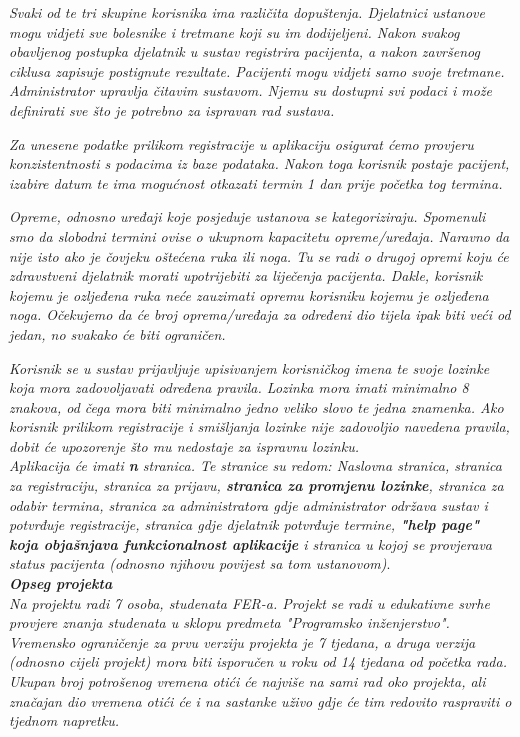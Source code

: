 		\textit{Svaki od te tri skupine korisnika ima različita dopuštenja. Djelatnici ustanove mogu vidjeti sve bolesnike i tretmane koji su im dodijeljeni. Nakon svakog obavljenog postupka djelatnik u sustav registrira pacijenta, a nakon završenog ciklusa zapisuje postignute rezultate. Pacijenti mogu vidjeti samo svoje tretmane. Administrator upravlja čitavim sustavom. Njemu su dostupni svi podaci i može definirati sve što je potrebno za ispravan rad sustava.}
		
		\textit{Za unesene podatke prilikom registracije u aplikaciju osigurat ćemo provjeru konzistentnosti s podacima iz baze podataka. Nakon toga korisnik postaje pacijent, izabire datum te ima mogućnost otkazati termin 1 dan prije početka tog termina.}
		
		\textit{Opreme, odnosno uređaji koje posjeduje ustanova se kategoriziraju. Spomenuli smo da slobodni termini ovise o ukupnom kapacitetu opreme/uređaja. Naravno da nije isto ako je čovjeku oštećena ruka ili noga. Tu se radi o drugoj opremi koju će zdravstveni djelatnik morati upotrijebiti za liječenja pacijenta. Dakle, korisnik kojemu je ozljeđena ruka neće zauzimati opremu korisniku kojemu je ozljeđena noga. Očekujemo da će broj oprema/uređaja za određeni dio tijela ipak biti veći od jedan, no svakako će biti ograničen.}
		
		\textit{Korisnik se u sustav prijavljuje upisivanjem korisničkog imena te svoje lozinke koja mora zadovoljavati određena pravila. Lozinka mora imati minimalno 8 znakova, od čega mora biti minimalno jedno veliko slovo te jedna znamenka. Ako korisnik prilikom registracije i smišljanja lozinke nije zadovoljio navedena pravila, dobit će upozorenje što mu nedostaje za ispravnu lozinku.}\\
		
		\textit{Aplikacija će imati \textbf{n} stranica. Te stranice su redom: Naslovna stranica, stranica za registraciju, stranica za prijavu, \textbf{stranica za promjenu lozinke}, stranica za odabir termina, stranica za administratora gdje administrator održava sustav i potvrđuje registracije, stranica gdje djelatnik potvrđuje termine, \textbf{"help page" koja objašnjava funkcionalnost aplikacije} i stranica u kojoj se provjerava status pacijenta (odnosno njihovu povijest sa tom ustanovom)}.\\
		
		\textbf{\textit{Opseg projekta}}\\
		
		\textit{Na projektu radi 7 osoba, studenata FER-a. Projekt se radi u edukativne svrhe provjere znanja studenata u sklopu predmeta "Programsko inženjerstvo". Vremensko ograničenje za prvu verziju projekta je 7 tjedana, a druga verzija (odnosno cijeli projekt) mora biti isporučen u roku od 14 tjedana od početka rada. Ukupan broj potrošenog vremena otići će najviše na sami rad oko projekta, ali značajan dio vremena otići će i na sastanke uživo gdje će tim redovito raspraviti o tjednom napretku.}
		
		\eject
		